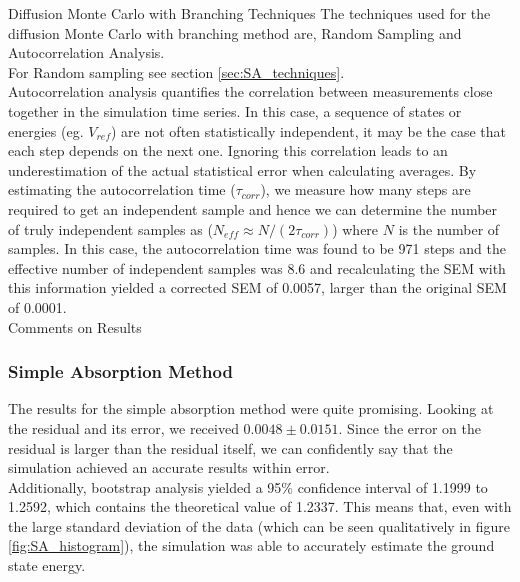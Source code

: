 \documentclass[reqno]{amsart}
\makeatletter
\renewcommand\subsection{\@startsection{subsection}{2}%
  \z@{.5\linespacing\@plus.7\linespacing}{-.5em}%
  {\normalfont\scshape\justify}}
\numberwithin{equation}{section}
\numberwithin{figure}{section}
\makeatother
\begin{document}
\subsection{Diffusion Monte Carlo with Branching Techniques}
The techniques used for the diffusion Monte Carlo with branching method are, Random Sampling and Autocorrelation Analysis. \\

For Random sampling see section \ref{sec:SA_techniques}. \\

Autocorrelation analysis quantifies the correlation between measurements close together in the simulation time series. In this case, a sequence of states or energies (eg. $V_{ref}$) are not often statistically independent, it may be the case that each step depends on the next one. Ignoring this correlation leads to an underestimation of the actual statistical error when calculating averages. By estimating the autocorrelation time ($\tau_{corr}$), we measure how many steps are required to get an independent sample and hence we can determine the number of truly independent samples as ($N_{eff} \approx N/(2\tau_{corr})$) where $N$ is the number of samples. In this case, the autocorrelation time was found to be 971 steps and the effective number of independent samples was 8.6 and recalculating the SEM with this information yielded a corrected SEM of 0.0057, larger than the original SEM of 0.0001. \\

\subsection{Comments on Results}
\subsubsection{Simple Absorption Method}

The results for the simple absorption method were quite promising. Looking at the residual and its error, we received $0.0048 \pm 0.0151$. Since the error on the residual is larger than the residual itself, we can confidently say that the simulation achieved an accurate results within error. \\

Additionally, bootstrap analysis yielded a 95\% confidence interval of 1.1999 to 1.2592, which contains the theoretical value of 1.2337. This means that, even with the large standard deviation of the data (which can be seen qualitatively in figure \ref{fig:SA_histogram}), the simulation was able to accurately estimate the ground state energy. \\
\end{document}
